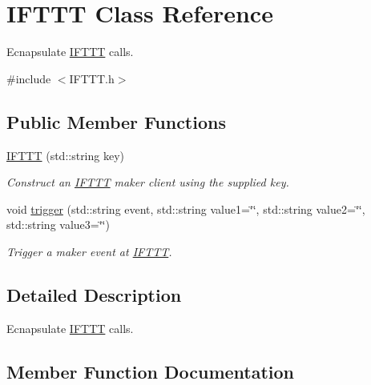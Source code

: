 \hypertarget{class_i_f_t_t_t}{}\section{I\+F\+T\+TT Class Reference}
\label{class_i_f_t_t_t}


Ecnapsulate \hyperlink{class_i_f_t_t_t}{I\+F\+T\+TT} calls.  




{\ttfamily \#include $<$I\+F\+T\+T\+T.\+h$>$}

\subsection*{Public Member Functions}
\begin{DoxyCompactItemize}
\item 
\hyperlink{class_i_f_t_t_t_a7e278f47812b25de0ed94c203bc6d356}{I\+F\+T\+TT} (std\+::string key)\hypertarget{class_i_f_t_t_t_a7e278f47812b25de0ed94c203bc6d356}{}\label{class_i_f_t_t_t_a7e278f47812b25de0ed94c203bc6d356}

\begin{DoxyCompactList}\small\item\em Construct an \hyperlink{class_i_f_t_t_t}{I\+F\+T\+TT} maker client using the supplied key. \end{DoxyCompactList}\item 
void \hyperlink{class_i_f_t_t_t_a5d98cd7b517c01040893870979b82234}{trigger} (std\+::string event, std\+::string value1=\char`\"{}\char`\"{}, std\+::string value2=\char`\"{}\char`\"{}, std\+::string value3=\char`\"{}\char`\"{})
\begin{DoxyCompactList}\small\item\em Trigger a maker event at \hyperlink{class_i_f_t_t_t}{I\+F\+T\+TT}. \end{DoxyCompactList}\end{DoxyCompactItemize}


\subsection{Detailed Description}
Ecnapsulate \hyperlink{class_i_f_t_t_t}{I\+F\+T\+TT} calls. 

\subsection{Member Function Documentation}
